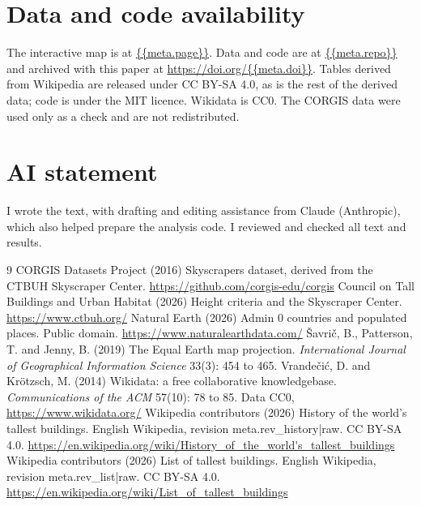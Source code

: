 \documentclass[11pt,a4paper]{article}
\begin{document}
\section*{Data and code availability}
The interactive map is at \url{{{meta.page}}}. Data and code are at \url{{{meta.repo}}} and archived with this paper at \url{https://doi.org/{{meta.doi}}}. Tables derived from Wikipedia are released under CC BY-SA 4.0, as is the rest of the derived data; code is under the MIT licence. Wikidata is CC0. The CORGIS data were used only as a check and are not redistributed.

\section*{AI statement}
I wrote the text, with drafting and editing assistance from Claude (Anthropic), which also helped prepare the analysis code. I reviewed and checked all text and results.

\begin{thebibliography}{9}
 CORGIS Datasets Project (2016) Skyscrapers dataset, derived from the CTBUH Skyscraper Center. \url{https://github.com/corgis-edu/corgis}
 Council on Tall Buildings and Urban Habitat (2026) Height criteria and the Skyscraper Center. \url{https://www.ctbuh.org/}
 Natural Earth (2026) Admin 0 countries and populated places. Public domain. \url{https://www.naturalearthdata.com/}
 Šavrič, B., Patterson, T. and Jenny, B. (2019) The Equal Earth map projection. \emph{International Journal of Geographical Information Science} 33(3): 454 to 465.
 Vrandečić, D. and Krötzsch, M. (2014) Wikidata: a free collaborative knowledgebase. \emph{Communications of the ACM} 57(10): 78 to 85. Data CC0, \url{https://www.wikidata.org/}
 Wikipedia contributors (2026) History of the world's tallest buildings. English Wikipedia, revision {{meta.rev_history|raw}}. CC BY-SA 4.0. \url{https://en.wikipedia.org/wiki/History_of_the_world's_tallest_buildings}
 Wikipedia contributors (2026) List of tallest buildings. English Wikipedia, revision {{meta.rev_list|raw}}. CC BY-SA 4.0. \url{https://en.wikipedia.org/wiki/List_of_tallest_buildings}
\end{thebibliography}
\end{document}
